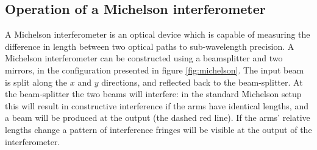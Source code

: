 \documentclass{kentigern}
\begin{document}
\subsection{Operation of a Michelson interferometer}
\label{sec:Michelson}
%
%
A Michelson interferometer is an optical device which is capable of
measuring the difference in length between two optical paths to
sub-wavelength precision. A Michelson interferometer can be
constructed using a beamsplitter and two mirrors, in the configuration
presented in figure \ref{fig:michelson}. The input beam is split along
the $x$ and $y$ directions, and reflected back to the
beam-splitter. At the beam-splitter the two beams will interfere: in
the standard Michelson setup this will result in constructive
interference if the arms have identical lengths, and a beam will be
produced at the output (the dashed red line). If the arms' relative
lengths change a pattern of interference fringes will be visible at
the output of the interferometer.
\end{document}
